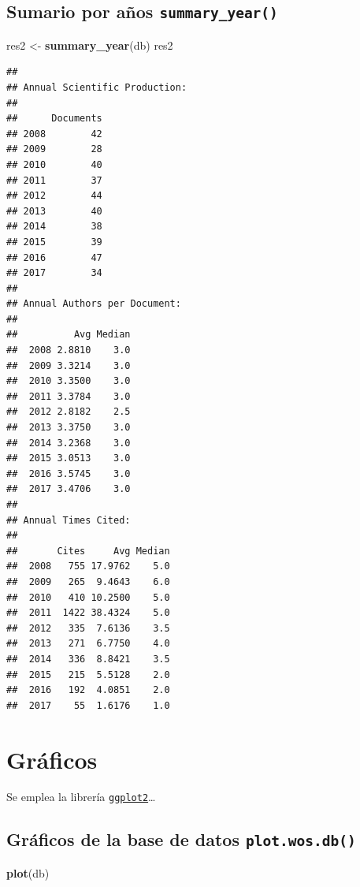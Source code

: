 \documentclass[]{book}
\newenvironment{Shaded}{\begin{snugshade}}{\end{snugshade}}
\newcommand{\KeywordTok}[1]{\textcolor[rgb]{0.13,0.29,0.53}{\textbf{#1}}}
\newcommand{\StringTok}[1]{\textcolor[rgb]{0.31,0.60,0.02}{#1}}
\newcommand{\NormalTok}[1]{#1}
\begin{document}
\subsection{\texorpdfstring{Sumario por años
\texttt{summary\_year()}}{Sumario por años summary\_year()}}\label{sumario-por-anos-summary_year}

\begin{Shaded}
\begin{Highlighting}[]
\NormalTok{res2 <-}\StringTok{ }\KeywordTok{summary_year}\NormalTok{(db)}
\NormalTok{res2}
\end{Highlighting}
\end{Shaded}

\begin{verbatim}
## 
## Annual Scientific Production:
## 
##      Documents
## 2008        42
## 2009        28
## 2010        40
## 2011        37
## 2012        44
## 2013        40
## 2014        38
## 2015        39
## 2016        47
## 2017        34
## 
## Annual Authors per Document:
## 
##          Avg Median
##  2008 2.8810    3.0
##  2009 3.3214    3.0
##  2010 3.3500    3.0
##  2011 3.3784    3.0
##  2012 2.8182    2.5
##  2013 3.3750    3.0
##  2014 3.2368    3.0
##  2015 3.0513    3.0
##  2016 3.5745    3.0
##  2017 3.4706    3.0
## 
## Annual Times Cited:
## 
##       Cites     Avg Median
##  2008   755 17.9762    5.0
##  2009   265  9.4643    6.0
##  2010   410 10.2500    5.0
##  2011  1422 38.4324    5.0
##  2012   335  7.6136    3.5
##  2013   271  6.7750    4.0
##  2014   336  8.8421    3.5
##  2015   215  5.5128    2.0
##  2016   192  4.0851    2.0
##  2017    55  1.6176    1.0
\end{verbatim}

\section{Gráficos}\label{graficos}

Se emplea la librería
\href{https://ggplot2.tidyverse.org}{\texttt{ggplot2}}\ldots{}

\subsection{\texorpdfstring{Gráficos de la base de datos
\texttt{plot.wos.db()}}{Gráficos de la base de datos plot.wos.db()}}\label{graficos-de-la-base-de-datos-plot.wos.db}

\begin{Shaded}
\begin{Highlighting}[]
\KeywordTok{plot}\NormalTok{(db)}
\end{Highlighting}
\end{Shaded}
\end{document}
